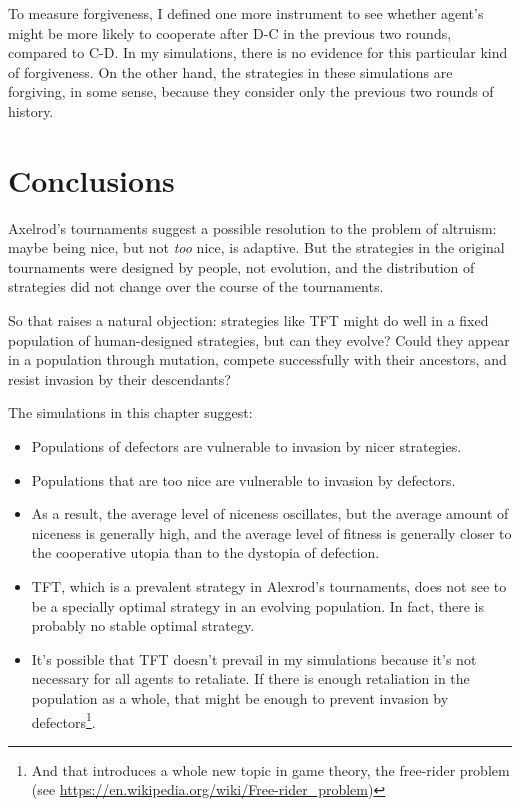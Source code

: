 \documentclass[12pt]{book}
\theoremstyle{exercise}
\begin{document}
To measure forgiveness, I defined one more instrument to see whether agent's might be more likely to cooperate after D-C in the previous two rounds, compared to C-D.  In my simulations, there is no evidence for this particular kind of forgiveness.  On the other hand, the strategies in these simulations are forgiving, in some sense, because they consider only the previous two rounds of history.


\section{Conclusions}

Axelrod's tournaments suggest a possible resolution to the problem of altruism: maybe being nice, but not {\em too} nice, is adaptive.  But the strategies in the original tournaments were designed by people, not evolution, and the distribution of strategies did not change over the course of the tournaments.

So that raises a natural objection: strategies like TFT might do well in a fixed population of human-designed strategies, but can they evolve?  Could they appear in a population through mutation, compete successfully with their ancestors, and resist invasion by their descendants?

The simulations in this chapter suggest:

\begin{itemize}

\item Populations of defectors are vulnerable to invasion by nicer strategies.

\item Populations that are too nice are vulnerable to invasion by defectors.

\item As a result, the average level of niceness oscillates, but the average amount of niceness is generally high, and the average level of fitness is generally closer to the cooperative utopia than to the dystopia of defection.

\item TFT, which is a prevalent strategy in Alexrod's tournaments, does not see to be a specially optimal strategy in an evolving population.  In fact, there is probably no stable optimal strategy.

\item It's possible that TFT doesn't prevail in my simulations because it's not necessary for all agents to retaliate.  If there is enough retaliation in the population as a whole, that might be enough to prevent invasion by defectors\footnote{And that introduces a whole new topic in game theory, the free-rider problem (see \url{https://en.wikipedia.org/wiki/Free-rider_problem})}.

\end{itemize}
\end{document}
